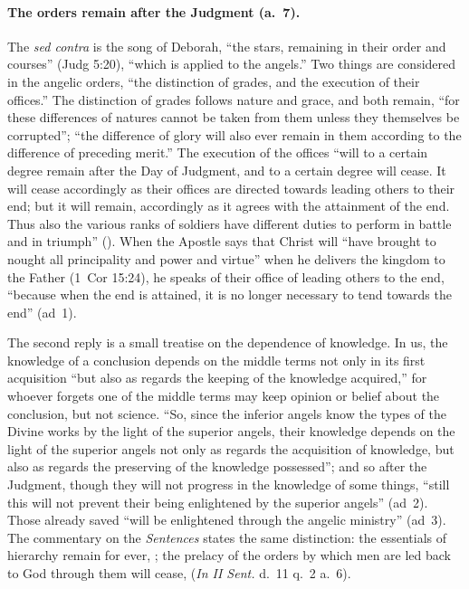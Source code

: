 \paragraph{The orders remain after the Judgment (a.~7).} The \emph{sed
contra} is the song of Deborah, ``the stars, remaining in their order and
courses'' (Judg 5:20), ``which is applied to the angels.'' Two things are
considered in the angelic orders, ``the distinction of grades, and the
execution of their offices.'' The distinction of grades follows nature and
grace, and both remain, ``for these differences of natures cannot be taken
from them unless they themselves be corrupted''; ``the difference of glory
will also ever remain in them according to the difference of preceding
merit.'' The execution of the offices ``will to a certain degree remain after
the Day of Judgment, and to a certain degree will cease. It will cease
accordingly as their offices are directed towards leading others to their
end; but it will remain, accordingly as it agrees with the attainment of the
end. Thus also the various ranks of soldiers have different duties to perform
in battle and in triumph'' (). When the Apostle says
that Christ will ``have brought to nought all principality and power and
virtue'' when he delivers the kingdom to the Father (1~Cor 15:24), he speaks
of their office of leading others to the end, ``because when the end is
attained, it is no longer necessary to tend towards the end'' (ad~1).

The second reply is a small treatise on the dependence of knowledge. In us,
the knowledge of a conclusion depends on the middle terms not only in its
first acquisition ``but also as regards the keeping of the knowledge
acquired,'' for whoever forgets one of the middle terms may keep opinion or
belief about the conclusion, but not science. ``So, since the inferior angels
know the types of the Divine works by the light of the superior angels, their
knowledge depends on the light of the superior angels not only as regards the
acquisition of knowledge, but also as regards the preserving of the knowledge
possessed''; and so after the Judgment, though they will not progress in the
knowledge of some things, ``still this will not prevent their being
enlightened by the superior angels'' (ad~2). Those already saved ``will be
enlightened through the angelic ministry'' (ad~3). The commentary on the
\emph{Sentences} states the same distinction: the essentials of hierarchy
remain for ever, ; the prelacy of the orders by which men are led back to God
through them will cease,  (\emph{In II Sent.}
d.~11 q.~2 a.~6).

